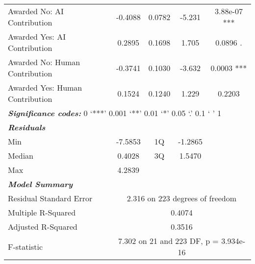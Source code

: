 \begin{table}[ht]
\begin{tabular}{lcccc}
        Awarded No: AI Contribution & -0.4088  & 0.0782  & -5.231  & 3.88e-07 ***  \\
        Awarded Yes: AI Contribution & 0.2895  & 0.1698  & 1.705  & 0.0896 .  \\
        Awarded No: Human Contribution & -0.3741  & 0.1030  & -3.632  & 0.0003 ***  \\
        Awarded Yes: Human Contribution & 0.1524  & 0.1240  & 1.229  & 0.2203  \\
        \midrule
        \multicolumn{5}{l}{\textbf{\textit{Significance codes:}} 0 ‘***’ 0.001 ‘**’ 0.01 ‘*’ 0.05 ‘.’ 0.1 ‘ ’ 1} \\
        \midrule
        \textbf{\textit{Residuals}} & \multicolumn{4}{c}{} \\
        Min & -7.5853 & 1Q & -1.2865 &  \\
        Median & 0.4028 & 3Q & 1.5470 &  \\
        Max & 4.2839 &  &  &  \\
        \midrule
        \textbf{\textit{Model Summary}}\\
        Residual Standard Error & \multicolumn{4}{c}{2.316 on 223 degrees of freedom} \\
        Multiple R-Squared & \multicolumn{4}{c}{0.4074} \\
        Adjusted R-Squared & \multicolumn{4}{c}{0.3516} \\
        F-statistic & \multicolumn{4}{c}{7.302 on 21 and 223 DF, p = 3.934e-16} \\
        \bottomrule
    \end{tabular}
    \label{tab:regression_trust_male}
\end{table}


